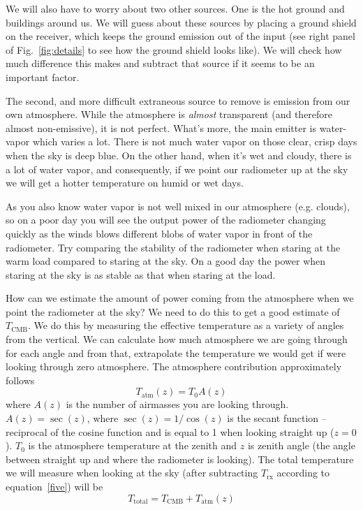 We will also have to worry about two other sources.
One is the hot ground and buildings around us. We will guess about these sources by placing a ground shield on the receiver, which keeps the ground emission out of the input (see right panel of Fig.~\ref{fig:details} to see how the ground shield looks like). We will check how much difference this makes and subtract that source if it seems to be an important factor.

The second, and more difficult extraneous source to remove is emission from our own atmosphere. While the atmosphere is \textit{almost} transparent (and therefore almost non-emissive), it is not perfect. What's more, the main emitter is water-vapor which varies a lot. There is not much water vapor on those clear, crisp days when the sky is deep blue. On the other hand, when it's wet and cloudy, there is a lot of water vapor, and consequently, if we point our radiometer up at the sky we will get a hotter temperature on humid or wet days.  

As you also know water vapor is not well mixed in our atmosphere (e.g. clouds), so on a poor day you will see the output power of the radiometer changing quickly as the winds blows different blobs of water vapor in front of the radiometer.  Try comparing the stability of the radiometer when staring at the warm load compared to staring at the sky. On a good day the power when staring at the sky is as stable as that when staring at the load.

How can we estimate the amount of power coming from the atmosphere when we point the radiometer at the sky? We need to do this to get a good estimate of $T_\textrm{CMB}$. We do this by measuring the effective temperature as a variety of angles from the vertical. We can calculate how much atmosphere we are going through for each angle and from that, extrapolate the temperature we would get if were looking through zero atmosphere. The atmosphere contribution approximately follows
\begin{equation}
T_\textrm{atm}(z) = T_0 A(z)
\end{equation}
where $A(z)$ is the number of airmasses you are looking through. $A(z)=\sec(z)$, where $\sec(z)=1/\cos(z)$ is the secant function -- reciprocal of the cosine function and is equal to 1 when looking straight up ($z=0$).
$T_0$ is the atmosphere temperature at the zenith and $z$ is zenith angle (the angle between straight up and where the radiometer is looking). The total temperature we will measure when looking at the sky (after subtracting $T_\textrm{rx}$ according to equation~\ref{five}) will be 
\begin{equation}
T_\textrm{total} = T_\textrm{CMB} + T_\textrm{atm}(z)
\label{seven}
\end{equation}

